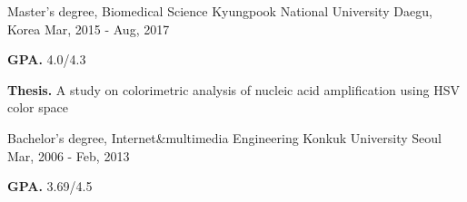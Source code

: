 \begin{cventries}
  \cventry
    {Master's degree, Biomedical Science}
    {Kyungpook National University}
    {Daegu, Korea}
    {Mar, 2015 - Aug, 2017}
    {
      \begin{cvitems}
        \item {\textbf{GPA.} 4.0/4.3}
        \item {\textbf{Thesis.} A study on colorimetric analysis of nucleic acid amplification using HSV color space}
      \end{cvitems}
    }
  \cventry
    {Bachelor's degree, Internet\&multimedia Engineering}
    {Konkuk University}
    {Seoul}
    {Mar, 2006 - Feb, 2013}
    {
        \begin{cvitems}
        \item {\textbf{GPA.} 3.69/4.5}
      \end{cvitems}
    }
\end{cventries}
